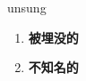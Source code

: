 
\begin{frame}
{\huge unsung}
\begin{center}
\begin{enumerate}\Large
  \item \textbf{被埋没的}
  \item \textbf{不知名的}
\end{enumerate}
\end{center}
\end{frame}
